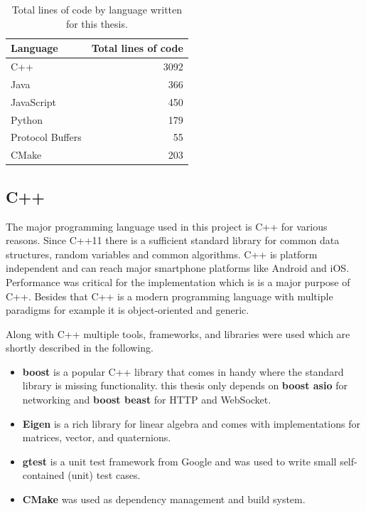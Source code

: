 \begin{table}[h]
    \centering
    \begin{tabular}{ | l | r | }
    \hline
    \textbf{Language} & \textbf{Total lines of code} \\ \hline
    C++               & 3092 \\ \hline
    Java              &  366 \\ \hline
    JavaScript        &  450 \\ \hline
    Python            &  179 \\ \hline
    Protocol Buffers  &   55 \\ \hline
    CMake             &  203 \\ \hline
    \end{tabular}
    \caption{Total lines of code by language written for this thesis.}
    \label{tbl:code_lines}
\end{table}

\subsection{C++}

The major programming language used in this project is C++ for various reasons. Since C++11 there is a sufficient standard library for common data structures, random variables and common algorithms. C++ is platform independent and can reach major smartphone platforms like Android and iOS. Performance was critical for the implementation which is is a major purpose of C++. Besides that C++ is a modern programming language with multiple paradigms for example it is object-oriented and generic.

Along with C++ multiple tools, frameworks, and libraries were used which are shortly described in the following.
\begin{itemize}
  \item \textbf{boost} is a popular C++ library that comes in handy where the standard library is missing functionality. this thesis only depends on \textbf{boost asio} for networking and \textbf{boost beast} for HTTP and WebSocket.
  \item \textbf{Eigen} is a rich library for linear algebra and comes with implementations for matrices, vector, and quaternions.
  \item \textbf{gtest} is a unit test framework from Google and was used to write small self-contained (unit) test cases.
  \item \textbf{CMake} was used as dependency management and build system.
\end{itemize}

